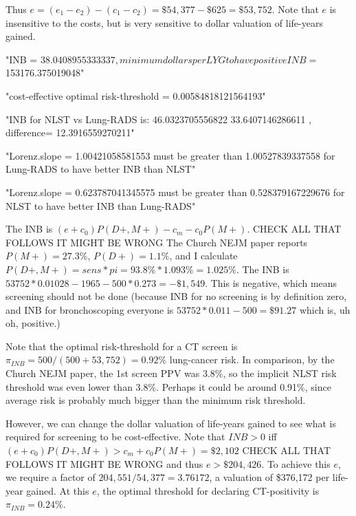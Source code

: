 \documentclass[11pt]{article}
\begin{document}
Thus $e=(e_1-e_2)-(c_1-c_2)=\$54,377-\$625=\$53,752$.  Note that $e$ is insensitive to the costs, but is very sensitive to dollar valuation of life-years gained.

\begin{Schunk}
\begin{Soutput}
[1] "INB = $ 38.0408955333337 , minimum dollars per LYG to have positive INB = $ 153176.375019048"
\end{Soutput}
\begin{Soutput}
[1] "cost-effective optimal risk-threshold =  0.00584818121564193"
\end{Soutput}
\begin{Soutput}
[1] "INB for NLST vs Lung-RADS is: 46.0323705556822 33.6407146286611 , difference= 12.3916559270211"
\end{Soutput}
\begin{Soutput}
[1] "Lorenz.slope = 1.00421058581553 must be greater than 1.00527839337558 for Lung-RADS to have better INB than NLST"
\end{Soutput}
\begin{Soutput}
[1] "Lorenz.slope = 0.623787041345575 must be greater than 0.528379167229676 for NLST to have better INB than Lung-RADS"
\end{Soutput}
\end{Schunk}

The INB is $(e+c_0)P(D+,M+)-c_m-c_0P(M+)$.  CHECK ALL THAT FOLLOWS IT MIGHT BE WRONG The Church NEJM paper reports $P(M+)=27.3\%$, $P(D+)=1.1\%$, and I calculate $P(D+,M+)=sens*pi=93.8\%*1.093\%=1.025\%$.  The INB is $53752*0.01028-1965-500*0.273=-\$1,549$.  This is negative, which means screening should not be done (because INB for no screening is by definition zero, and INB for bronchoscoping everyone is $53752*0.011-500=\$91.27$ which is, uh oh, positive.)

Note that the optimal risk-threshold for a CT screen is $\pi_{INB}=500/(500+53,752)=0.92\%$ lung-cancer risk.  In comparison, by the Church NEJM paper, the 1st screen PPV  was 3.8\%, so the implicit NLST risk threshold was even lower than 3.8\%.  Perhaps it could be around 0.91\%, since average risk is probably much bigger than the minimum risk threshold. 

However, we can change the dollar valuation of life-years gained to see what is required for screening to be cost-effective.  Note that $INB>0$ iff $(e+c_0)P(D+,M+)>c_m+c_0P(M+)=\$2,102$ CHECK ALL THAT FOLLOWS IT MIGHT BE WRONG  and thus $e>\$204,426$.  To achieve this $e$, we require a factor of $204,551/54,377=3.76172$, a valuation of \$376,172 per life-year gained.  At this $e$, the optimal threshold for declaring CT-positivity is $\pi_{INB}=0.24\%$.
\end{document}
